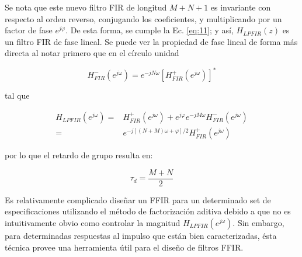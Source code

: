 \documentclass[conference]{IEEEtran}
\begin{document}
Se nota que este nuevo filtro FIR de longitud \(M+N+1\) es invariante con respecto al orden reverso, conjugando los coeficientes, y multiplicando por un factor de fase \(e^{j\varphi}\). De esta forma, se cumple la Ec. \ref{eq:11}; y así, \(H_{LPFIR}(z)\) es un filtro FIR de fase lineal. Se puede ver la propiedad de fase lineal de forma más directa al notar primero que en el círculo unidad

\begin{equation}
    H_{FIR}^{-}(e^{j\omega}) = e^{-jN\omega} \left[ H_{FIR}^{ + } \left( e^{j\omega} \right ) \right]^{*}
\end{equation}

tal que

\begin{align}
    H_{LPFIR}(e^{j\omega}) =& H_{FIR}^{+}\left( e^{j\omega} \right) + e^{j\varphi} e^{-jM\omega} H_{FIR}^{-} \left( e^{j\omega} \right) \\
                           =& e^{-j[(N + M)\omega + \varphi]/2} H_{FIR}^{ + } \left( e^{j\omega} \right)
\end{align}

por lo que el retardo de grupo resulta en:

\begin{equation}
    \tau_d = \frac{M+N}{2}
\end{equation}

Es relativamente complicado diseñar un FFIR para un determinado set de especificaciones utilizando el método de factorización aditiva debido a que no es intuitivamente obvio como controlar la magnitud \(H_{LPFIR}\left( e^{j\omega} \right)\). Sin embargo, para determinadas respuestas al impulso que están bien caracterizadas, ésta técnica provee una herramienta útil para el diseño de filtros FFIR.
\end{document}
